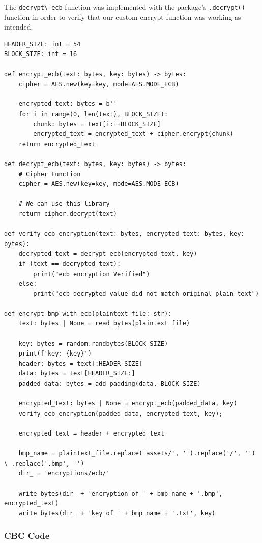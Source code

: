 \documentclass[11pt]{article}
\begin{document}
The \verb|decrypt\_ecb| function was implemented with the package's \verb|.decrypt()| function in order to verify that our custom encrypt function was working as intended.

\begin{lstlisting}
HEADER_SIZE: int = 54
BLOCK_SIZE: int = 16

def encrypt_ecb(text: bytes, key: bytes) -> bytes:
    cipher = AES.new(key=key, mode=AES.MODE_ECB)

    encrypted_text: bytes = b''
    for i in range(0, len(text), BLOCK_SIZE):
        chunk: bytes = text[i:i+BLOCK_SIZE]
        encrypted_text = encrypted_text + cipher.encrypt(chunk)
    return encrypted_text 

def decrypt_ecb(text: bytes, key: bytes) -> bytes:
    # Cipher Function
    cipher = AES.new(key=key, mode=AES.MODE_ECB)
    
    # We can use this library
    return cipher.decrypt(text)

def verify_ecb_encryption(text: bytes, encrypted_text: bytes, key: bytes):
    decrypted_text = decrypt_ecb(encrypted_text, key)
    if (text == decrypted_text):
        print("ecb encryption Verified")
    else:
        print("ecb decrypted value did not match original plain text")

def encrypt_bmp_with_ecb(plaintext_file: str):
    text: bytes | None = read_bytes(plaintext_file)

    key: bytes = random.randbytes(BLOCK_SIZE)
    print(f'key: {key}')
    header: bytes = text[:HEADER_SIZE]
    data: bytes = text[HEADER_SIZE:]
    padded_data: bytes = add_padding(data, BLOCK_SIZE)

    encrypted_text: bytes | None = encrypt_ecb(padded_data, key)
    verify_ecb_encryption(padded_data, encrypted_text, key);

    encrypted_text = header + encrypted_text

    bmp_name = plaintext_file.replace('assets/', '').replace('/', '') \ .replace('.bmp', '')
    dir_ = 'encryptions/ecb/'

    write_bytes(dir_ + 'encryption_of_' + bmp_name + '.bmp', encrypted_text)
    write_bytes(dir_ + 'key_of_' + bmp_name + '.txt', key)
\end{lstlisting}

\subsubsection*{CBC Code}
\end{document}
